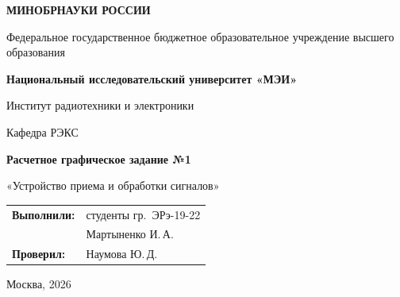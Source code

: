 \begin{titlepage}
    \centering
    {\bfseries МИНОБРНАУКИ РОССИИ\par}
    Федеральное государственное бюджетное образовательное учреждение высшего образования \\
    {\bfseries Национальный исследовательский университет «МЭИ»\par}
    \vspace{1cm}
    Институт радиотехники и электроники\par
    Кафедра РЭКС\par
    \vspace{3cm}
    
    {\bfseries\large Расчетное графическое задание №1\par}
    \vspace{0.5cm}
    {\large «Устройство приема и обработки сигналов»\par}
    
    \vspace{3.5cm}
 \vspace{1.5cm}
\noindent\hfill
\begin{tabular}{@{}ll@{}}
    \textbf{Выполнили:} & студенты гр.~ЭРэ-19-22 \\
                        & Мартыненко И.\,А. \\
    \textbf{Проверил:}  & Наумова Ю.\,Д.
\end{tabular}   
    \vfill
    {Москва, 2026}
\end{titlepage}

